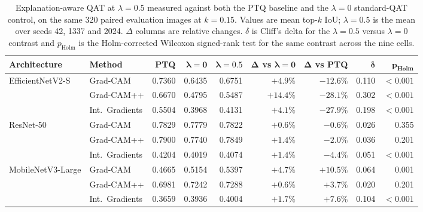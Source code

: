 \documentclass[fleqn,10pt]{wlscirep}
\begin{document}
\begin{table}[htbp]
\centering
\small
\caption{Explanation-aware QAT at $\lambda = 0.5$ measured against both the PTQ baseline and the $\lambda = 0$ standard-QAT control, on the same 320 paired evaluation images at $k = 0.15$. Values are mean top-$k$ IoU; $\lambda = 0.5$ is the mean over seeds 42, 1337 and 2024. $\Delta$ columns are relative changes. $\delta$ is Cliff's delta for the $\lambda = 0.5$ versus $\lambda = 0$ contrast and $p_{\text{Holm}}$ is the Holm-corrected Wilcoxon signed-rank test for the same contrast across the nine cells.}
\label{tab:qat_control}
\begin{tabular}{llrrrrrrr}
\toprule
\textbf{Architecture} & \textbf{Method} & \textbf{PTQ} & $\boldsymbol{\lambda=0}$ & $\boldsymbol{\lambda=0.5}$ & $\boldsymbol{\Delta}$ \textbf{vs} $\boldsymbol{\lambda=0}$ & $\boldsymbol{\Delta}$ \textbf{vs PTQ} & $\boldsymbol{\delta}$ & $\boldsymbol{p_{\text{Holm}}}$ \\
\midrule
\multirow{3}{*}{EfficientNetV2-S} & Grad-CAM & 0.7360 & 0.6435 & 0.6751 & $+4.9\%$ & $-12.6\%$ & 0.110 & $<0.001$ \\
 & Grad-CAM++ & 0.6670 & 0.4795 & 0.5487 & $+14.4\%$ & $-28.1\%$ & 0.302 & $<0.001$ \\
 & Int.\ Gradients & 0.5504 & 0.3968 & 0.4131 & $+4.1\%$ & $-27.9\%$ & 0.198 & $<0.001$ \\
\midrule
\multirow{3}{*}{ResNet-50} & Grad-CAM & 0.7829 & 0.7779 & 0.7822 & $+0.6\%$ & $-0.6\%$ & 0.026 & 0.355 \\
 & Grad-CAM++ & 0.7900 & 0.7740 & 0.7849 & $+1.4\%$ & $-2.0\%$ & 0.036 & 0.201 \\
 & Int.\ Gradients & 0.4204 & 0.4019 & 0.4074 & $+1.4\%$ & $-4.4\%$ & 0.051 & $<0.001$ \\
\midrule
\multirow{3}{*}{MobileNetV3-Large} & Grad-CAM & 0.4665 & 0.5154 & 0.5397 & $+4.7\%$ & $+10.5\%$ & 0.064 & 0.001 \\
 & Grad-CAM++ & 0.6981 & 0.7242 & 0.7288 & $+0.6\%$ & $+3.7\%$ & 0.020 & 0.201 \\
 & Int.\ Gradients & 0.3659 & 0.3936 & 0.4004 & $+1.7\%$ & $+7.6\%$ & 0.104 & $<0.001$ \\
\bottomrule
\end{tabular}
\end{table}
\end{document}
